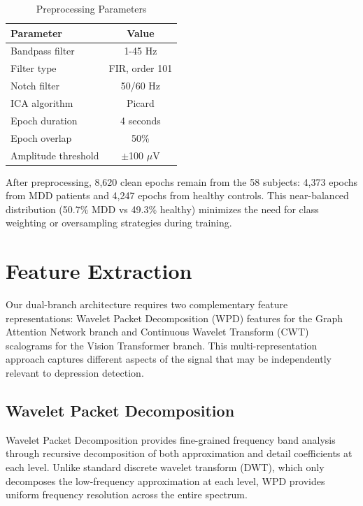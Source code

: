 \documentclass[blue,fullpaper]{ludusofficial}  %
\begin{document}
\begin{table}[h!]
\centering
\caption{Preprocessing Parameters}
\label{tab:preprocessing}
\begin{tabular}{|l|c|}
\hline
\textbf{Parameter} & \textbf{Value} \\
\hline
Bandpass filter & 1-45 Hz \\
\hline
Filter type & FIR, order 101 \\
\hline
Notch filter & 50/60 Hz \\
\hline
ICA algorithm & Picard \\
\hline
Epoch duration & 4 seconds \\
\hline
Epoch overlap & 50\% \\
\hline
Amplitude threshold & $\pm$100 $\mu$V \\
\hline
\end{tabular}
\end{table}

After preprocessing, 8,620 clean epochs remain from the 58 subjects: 4,373 epochs from MDD patients and 4,247 epochs from healthy controls. This near-balanced distribution (50.7\% MDD vs 49.3\% healthy) minimizes the need for class weighting or oversampling strategies during training.

\section{Feature Extraction}

Our dual-branch architecture requires two complementary feature representations: Wavelet Packet Decomposition (WPD) features for the Graph Attention Network branch and Continuous Wavelet Transform (CWT) scalograms for the Vision Transformer branch. This multi-representation approach captures different aspects of the signal that may be independently relevant to depression detection.

\subsection{Wavelet Packet Decomposition}

Wavelet Packet Decomposition provides fine-grained frequency band analysis through recursive decomposition of both approximation and detail coefficients at each level. Unlike standard discrete wavelet transform (DWT), which only decomposes the low-frequency approximation at each level, WPD provides uniform frequency resolution across the entire spectrum.
\end{document}
